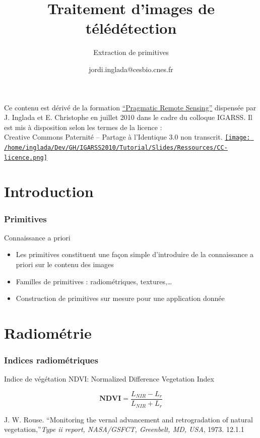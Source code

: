 \documentclass[compress,handout]{beamer}
\title{Traitement d'images de télédétection}
\subtitle{Extraction de primitives}
\author
{jordi.inglada@cesbio.cnes.fr}
\institute[Cesbio] %
{\textsc{Centre d'Études Spatiales de la Biosphère, Toulouse, France}}
\date{}
\begin{document}
\begin{frame}
  \titlepage
  \begin{center}
{\tiny Ce contenu est dérivé de la formation \href{http://www.orfeo-toolbox.org/packages/PragmaticRemoteSensing-handout.pdf}{``Pragmatic Remote
  Sensing''} dispensée par J. Inglada et E. Christophe en juillet 2010
  dans le cadre du colloque IGARSS. Il est mis à disposition selon les termes de la licence :\\
Creative Commons Paternité – Partage à l’Identique 3.0 non transcrit.} \href{http://creativecommons.org/licenses/by-sa/3.0/}{\texttt{[image: /home/inglada/Dev/GH/IGARSS2010/Tutorial/Slides/Ressources/CC-licence.png]}}    
  \end{center}
\end{frame}

\section{Introduction}

\begin{frame}
\frametitle{Primitives}

\begin{block}{Connaissance a priori}
\begin{itemize}
\item Les primitives constituent une façon simple d'introduire de la
  connaissance a priori sur le contenu des images
\item Familles de primitives : radiométriques, textures,\ldots
\item Construction de primitives sur mesure pour une application donnée
\end{itemize}
\end{block}

\end{frame}

\section{Radiométrie}

\begin{frame}
\frametitle{Indices radiométriques}
Indice de végétation NDVI: Normalized Difference Vegetation Index \cite{Rouse1973-NDVI}

\begin{equation}
 \mathbf{NDVI} = \frac{L_{NIR}-L_{r}}{L_{NIR}+L_{r}}
 \end{equation}

\begin{thebibliography}{noidea}
\footnotesize
{}
J. W. Rouse. ``Monitoring the vernal advancement and retrogradation of natural vegetation,''{\em Type ii report, NASA/GSFCT, Greenbelt, MD, USA}, 1973. 12.1.1
\end{thebibliography}

\end{frame}
\end{document}
